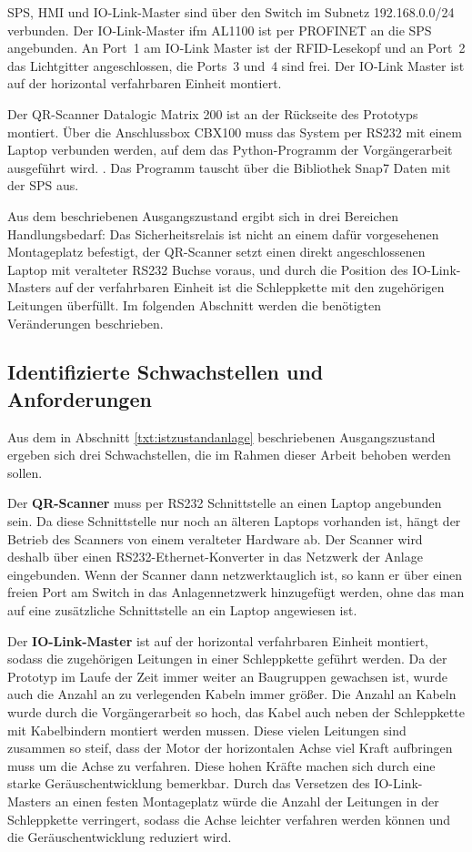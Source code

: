 SPS, HMI und IO-Link-Master sind über den Switch im Subnetz 192.168.0.0/24 verbunden. Der IO-Link-Master ifm AL1100 ist per PROFINET an die SPS angebunden. An Port~1 am IO-Link Master ist der RFID-Lesekopf und an Port~2 das Lichtgitter angeschlossen, die Ports~3 und~4 sind frei. Der IO-Link Master ist auf der horizontal verfahrbaren Einheit montiert. 

Der QR-Scanner Datalogic Matrix 200 ist an der Rückseite des Prototyps montiert. Über die Anschlussbox CBX100 muss das System per RS232 mit einem Laptop verbunden werden, auf dem das Python-Programm der Vorgängerarbeit ausgeführt wird. \cite{schaal_zorko_t3200}. Das Programm tauscht über die Bibliothek Snap7 Daten mit der SPS aus.

Aus dem beschriebenen Ausgangszustand ergibt sich in drei Bereichen Handlungsbedarf: Das Sicherheitsrelais ist nicht an einem dafür vorgesehenen Montageplatz befestigt, der QR-Scanner setzt einen direkt angeschlossenen Laptop mit veralteter RS232 Buchse voraus, und durch die Position des IO-Link-Masters auf der verfahrbaren Einheit ist die Schleppkette mit den zugehörigen Leitungen überfüllt. Im folgenden Abschnitt werden die benötigten Veränderungen beschrieben.

\subsection{Identifizierte Schwachstellen und Anforderungen}
Aus dem in Abschnitt \ref{txt:istzustandanlage} beschriebenen Ausgangszustand ergeben sich drei Schwachstellen, die im Rahmen dieser Arbeit behoben werden sollen.

Der \textbf{QR-Scanner} muss per RS232 Schnittstelle an einen Laptop angebunden sein. Da diese Schnittstelle nur noch an älteren Laptops vorhanden ist, hängt der Betrieb des Scanners von einem veralteter Hardware ab.
Der Scanner wird deshalb über einen RS232-Ethernet-Konverter in das Netzwerk der Anlage eingebunden. Wenn der Scanner dann netzwerktauglich ist, so kann er über einen freien Port am Switch in das Anlagennetzwerk hinzugefügt werden, ohne das man auf eine zusätzliche Schnittstelle an ein Laptop angewiesen ist. 

Der \textbf{IO-Link-Master} ist auf der horizontal verfahrbaren Einheit montiert, sodass die zugehörigen Leitungen in einer Schleppkette geführt werden. Da der Prototyp im Laufe der Zeit immer weiter an Baugruppen gewachsen ist, wurde auch die Anzahl an zu verlegenden Kabeln immer größer. Die Anzahl an Kabeln wurde durch die Vorgängerarbeit so hoch, das Kabel auch neben der Schleppkette mit Kabelbindern montiert werden mussen. Diese vielen Leitungen sind zusammen so steif, dass der Motor der horizontalen Achse viel Kraft aufbringen muss um die Achse zu verfahren. Diese hohen Kräfte machen sich durch eine starke Geräuschentwicklung bemerkbar. Durch das Versetzen des IO-Link-Masters an einen festen Montageplatz würde die Anzahl der Leitungen in der Schleppkette verringert, sodass die Achse leichter verfahren werden können und die Geräuschentwicklung reduziert wird.

